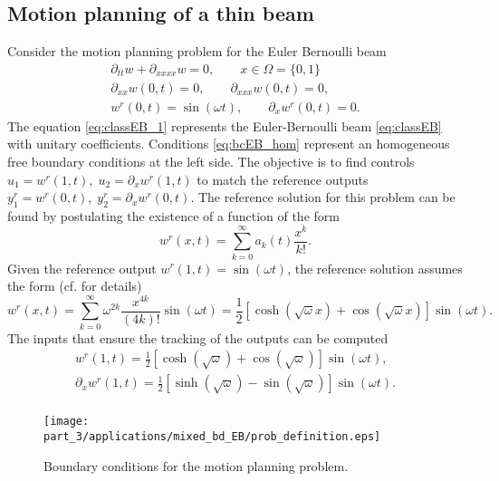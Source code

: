 \subsection{Motion planning of a thin beam}
Consider the motion planning problem for the Euler Bernoulli beam \cite[Chapter 12]{krstic2008boundary}
\begin{align}
\partial_{tt} w + \partial_{xxxx} w = 0,  \qquad x\in \Omega=\{0, 1\} \label{eq:classEB_1}\\
\partial_{xx} w(0, t) = 0, \qquad \partial_{xxx} w (0, t) = 0, \label{eq:bcEB_hom}\\
w^r(0, t) = \sin(\omega t), \qquad \partial_x w^r(0, t) = 0. \label{eq:bcEB_r}
\end{align}
The equation \eqref{eq:classEB_1} represents the Euler-Bernoulli beam \eqref{eq:classEB} with unitary coefficients. Conditions \eqref{eq:bcEB_hom} represent an homogeneous free boundary conditions at the left side. The objective is to find controls $u_1 = w^r(1, t), \; u_2 =\partial_x w^r(1, t)$ to match the reference outputs $y_1^r = w^r(0, t), \; y_2^r=\partial_x w^r(0, t)$. The reference solution for this problem can be found by postulating the existence of a function of the form
\begin{equation*}
	w^r(x, t) = \sum_{k=0}^{\infty} a_k(t) \frac{x^k}{k !}.
\end{equation*}
Given the reference output $w^r(1, t)= \sin(\omega t)$, the reference solution assumes the form (cf. \cite[Chapter 12]{krstic2008boundary} for details)
\begin{equation}\label{eq:refsol_EB}
w^r(x, t) = \sum_{k=0}^{\infty} \omega^{2k} \frac{x^{4k}}{(4k)!}\sin(\omega t) = \frac{1}{2}[\cosh(\sqrt{\omega} x) + \cos(\sqrt{\omega} x)]\sin(\omega t).
\end{equation}
The inputs that ensure the tracking of the outputs can be computed
\begin{equation}
\begin{aligned}
w^r(1, t) = \frac{1}{2}[\cosh(\sqrt{\omega}) + \cos(\sqrt{\omega})]\sin(\omega t), \\
\partial_x w^r(1, t) = \frac{1}{2}[\sinh(\sqrt{\omega}) - \sin(\sqrt{\omega})]\sin(\omega t). \\
\end{aligned}
\end{equation}

\begin{figure}[t]%
	\centering
	\texttt{[image: part\_3/applications/mixed\_bd\_EB/prob\_definition.eps]} \\
	\caption{Boundary conditions for the motion planning problem.}
	\label{fig:prob_def_EB}
\end{figure}

